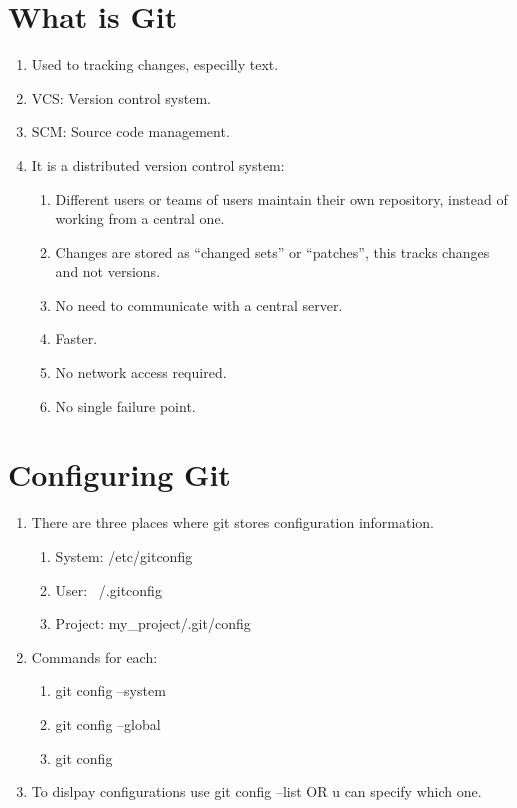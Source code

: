 \documentclass[a4paper, fontsize=12pt, twoside]{article} %
\begin{document}
	\section{What is Git}
	\begin{enumerate}
		\item Used to tracking changes, especilly text.
		\item VCS: Version control system.
		\item SCM: Source code management.
		\item It is a distributed version control system:
			\begin{enumerate}
				\item Different users or teams of users maintain their own repository, instead of working from a central one.
				\item Changes are stored as ``changed sets'' or ``patches'', this tracks changes and not versions.
				\item No need to communicate with a central server.
				\item Faster.
				\item No network access required.
				\item No single failure point.
			\end{enumerate}
	\end{enumerate}
\section{Configuring Git}
\begin{enumerate}
	\item There are three places where git stores configuration information.
		\begin{enumerate}
			\item				System: /etc/gitconfig
			\item				User: ~/.gitconfig
			\item				Project: my\_project/.git/config
		\end{enumerate}
	\item Commands for each:
		\begin{enumerate}
			\item git config --system 
			\item git config --global
			\item git config
		\end{enumerate}
	\item To dislpay configurations use git config --list  OR u can specify which one.
\end{enumerate}
\end{document}
